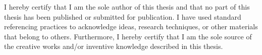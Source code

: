 I hereby certify that I am the sole author of this thesis and that no part of this thesis has been published or submitted for publication. 
I have used standard referencing practices to acknowledge ideas, research techniques, or other materials that belong to others. 
Furthermore, I hereby certify that I am the sole source of the creative works and/or inventive knowledge described in this thesis. 